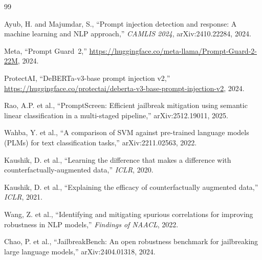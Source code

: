 \documentclass[11pt,a4paper]{article}
\begin{document}

\begin{thebibliography}{99}

Ayub, H. and Majumdar, S.,
``Prompt injection detection and response: A machine learning and NLP
approach,''
\emph{CAMLIS 2024}, arXiv:2410.22284, 2024.

Meta,
``Prompt Guard~2,''
\url{https://huggingface.co/meta-llama/Prompt-Guard-2-22M}, 2024.

ProtectAI,
``DeBERTa-v3-base prompt injection v2,''
\url{https://huggingface.co/protectai/deberta-v3-base-prompt-injection-v2}, 2024.

Rao, A.P. et al.,
``PromptScreen: Efficient jailbreak mitigation using semantic linear
classification in a multi-staged pipeline,''
arXiv:2512.19011, 2025.

Wahba, Y. et al.,
``A comparison of SVM against pre-trained language models (PLMs) for
text classification tasks,''
arXiv:2211.02563, 2022.

Kaushik, D. et al.,
``Learning the difference that makes a difference with
counterfactually-augmented data,''
\emph{ICLR}, 2020.

Kaushik, D. et al.,
``Explaining the efficacy of counterfactually augmented data,''
\emph{ICLR}, 2021.

Wang, Z. et al.,
``Identifying and mitigating spurious correlations for improving
robustness in NLP models,''
\emph{Findings of NAACL}, 2022.

Chao, P. et al.,
``JailbreakBench: An open robustness benchmark for jailbreaking large
language models,''
arXiv:2404.01318, 2024.

\end{thebibliography}
\end{document}
